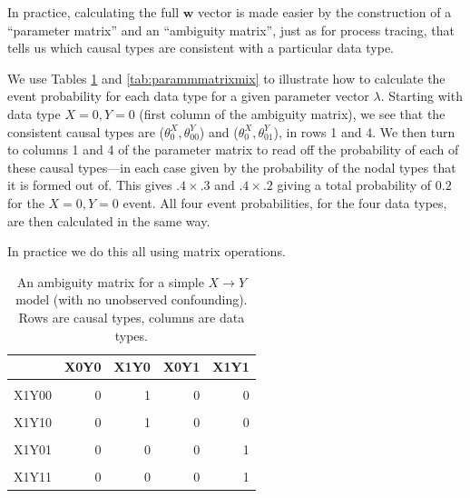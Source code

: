 \documentclass[
  12pt,
]{book}
\begin{document}
In practice, calculating the full \(\mathbf w\) vector is made easier by the construction of a ``parameter matrix'' and an ``ambiguity matrix'', just as for process tracing, that tells us which causal types are consistent with a particular data type.

We use Tables \ref{tab:ambigmatrixmix} and \ref{tab:parammmatrixmix} to illustrate how to calculate the event probability for each data type for a given parameter vector \(\lambda\). Starting with data type \(X=0, Y=0\) (first column of the ambiguity matrix), we see that the consistent causal types are (\(\theta^X_0, \theta^Y_{00}\)) and (\(\theta^X_0, \theta^Y_{01}\)), in rows 1 and 4. We then turn to columns 1 and 4 of the parameter matrix to read off the probability of each of these causal types---in each case given by the probability of the nodal types that it is formed out of. This gives \(.4 \times .3\) and \(.4\times .2\) giving a total probability of \(0.2\) for the \(X=0, Y=0\) event. All four event probabilities, for the four data types, are then calculated in the same way.

In practice we do this all using matrix operations.

\begin{table}

\caption{\label{tab:ambigmatrixmix}An ambiguity matrix for a simple $X \rightarrow Y$ model (with no unobserved confounding). Rows are causal types, columns are data types.}
\centering
\begin{tabular}[t]{lrrrr}
\toprule
  & X0Y0 & X1Y0 & X0Y1 & X1Y1\\
\midrule
\cellcolor{gray!6}{X0Y00} & \cellcolor{gray!6}{1} & \cellcolor{gray!6}{0} & \cellcolor{gray!6}{0} & \cellcolor{gray!6}{0}\\
X1Y00 & 0 & 1 & 0 & 0\\
\cellcolor{gray!6}{X0Y10} & \cellcolor{gray!6}{0} & \cellcolor{gray!6}{0} & \cellcolor{gray!6}{1} & \cellcolor{gray!6}{0}\\
X1Y10 & 0 & 1 & 0 & 0\\
\cellcolor{gray!6}{X0Y01} & \cellcolor{gray!6}{1} & \cellcolor{gray!6}{0} & \cellcolor{gray!6}{0} & \cellcolor{gray!6}{0}\\
\addlinespace
X1Y01 & 0 & 0 & 0 & 1\\
\cellcolor{gray!6}{X0Y11} & \cellcolor{gray!6}{0} & \cellcolor{gray!6}{0} & \cellcolor{gray!6}{1} & \cellcolor{gray!6}{0}\\
X1Y11 & 0 & 0 & 0 & 1\\
\bottomrule
\end{tabular}
\end{table}
\end{document}
